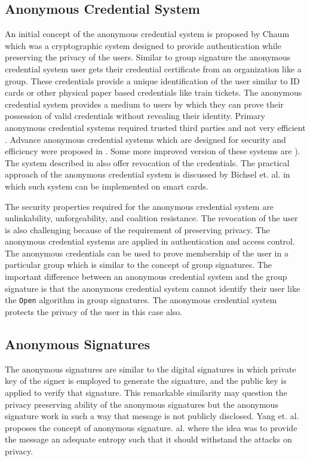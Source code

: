 \subsection{Anonymous Credential System}
An initial concept of the anonymous credential system is proposed by Chaum \cite{chaum1983blind} which was a cryptographic system designed to provide authentication while preserving the privacy of the users. Similar to group signature the anonymous credential system user gets their credential certificate from an organization like a group. These credentials provide a unique identification of the user similar to ID cards or other physical paper based credentials like train tickets. The anonymous credential system provides a medium to users by which they can prove their possession of valid credentials without revealing their identity. Primary anonymous credential systems required trusted third parties \cite{chaum1986secure} and not very efficient \cite{chaum1985security, damgaard1988payment, lysyanskaya1999pseudonym}. Advance anonymous credential systems which are designed for security and efficiency were proposed in \cite{camenisch2001efficient, camenisch2002dynamic}. Some more improved version of these systems are \cite{camenisch2004signature, camenisch2008efficient, camenisch2009accumulator, camenisch2010solving}). The system described in \cite{camenisch2009accumulator, camenisch2010solving} also offer revocation of the credentials. The practical approach of the anonymous credential system is discussed by Bichsel et. al. \cite{bichsel2009anonymous} in which such system can be implemented on smart cards. 

The security properties required for the anonymous credential system are unlinkability, unforgeability, and coalition resistance. The revocation of the user is also challenging because of the requirement of preserving privacy. The anonymous credential systems are applied in authentication and access control. The anonymous credentials can be used to prove membership of the user in a particular group which is similar to the concept of group signatures. The important difference between an anonymous credential system and the group signature is that the anonymous credential system cannot identify their user like the \texttt{Open} algorithm in group signatures. The anonymous credential system protects the privacy of the user in this case also.

\subsection{Anonymous Signatures}
The anonymous signatures are similar to the digital signatures in which private key of the signer is employed to generate the signature, and the public key is applied to verify that signature. This remarkable similarity may question the privacy preserving ability of the anonymous signatures but the anonymous signature work in such a way that message is not publicly disclosed. Yang et. al.  proposes the concept of anonymous signature. al. \cite{yang2006anonymous} where the idea was to provide the message an adequate entropy such that it should withstand the attacks on privacy. 


